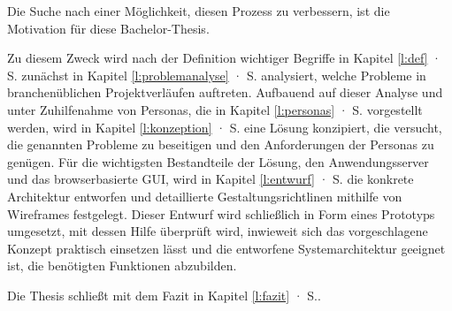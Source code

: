 \bigskip

Die Suche nach einer Möglichkeit, diesen Prozess zu verbessern, ist die Motivation für diese Bachelor-Thesis. 

\bigskip

Zu diesem Zweck wird nach der Definition wichtiger Begriffe in Kapitel \ref{l:def} · S.\pageref{l:def} zunächst in Kapitel \ref{l:problemanalyse} · S.\pageref{l:problemanalyse} analysiert, welche Probleme in branchenüblichen Projektverläufen auftreten. Aufbauend auf dieser Analyse und unter Zuhilfenahme von Personas, die in Kapitel \ref{l:personas} · S.\pageref{l:personas} vorgestellt werden, wird in Kapitel \ref{l:konzeption} · S.\pageref{l:konzeption} eine Lösung konzipiert, die versucht, die genannten Probleme zu beseitigen und den Anforderungen der Personas zu genügen. Für die wichtigsten Bestandteile der Lösung, den Anwendungsserver und das browserbasierte GUI, wird in Kapitel \ref{l:entwurf} · S.\pageref{l:entwurf} die konkrete Architektur entworfen und detaillierte Gestaltungsrichtlinen mithilfe von Wireframes festgelegt. Dieser Entwurf wird schließlich in Form eines Prototyps umgesetzt, mit dessen Hilfe überprüft wird, inwieweit sich das vorgeschlagene Konzept praktisch einsetzen lässt und die entworfene Systemarchitektur geeignet ist, die benötigten Funktionen abzubilden.

Die Thesis schließt mit dem Fazit in Kapitel \ref{l:fazit} · S.\pageref{l:fazit}.

\pagebreak